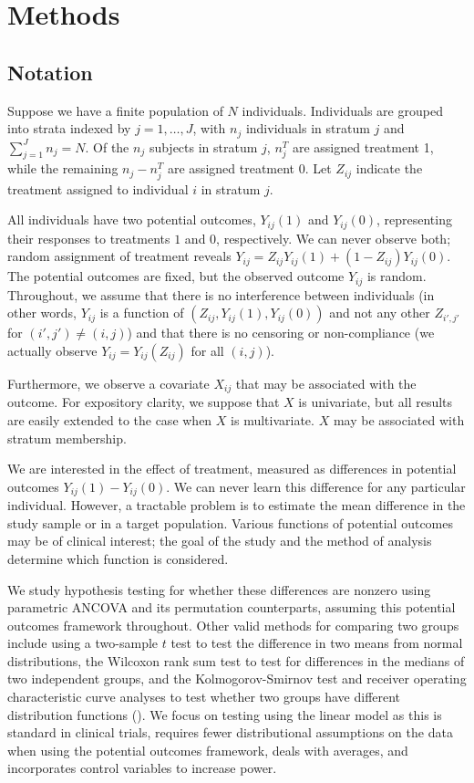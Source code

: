 \documentclass[12pt]{article}
\begin{document}
\section{Methods}\label{sec:methods}

\subsection{Notation}
Suppose we have a finite population of $N$ individuals.
Individuals are grouped into strata indexed by $j = 1, \dots, J$, with $n_j$ individuals in stratum $j$ and $\sum_{j=1}^J n_j = N$.
Of the $n_j$ subjects in stratum $j$, $n_j^T$ are assigned treatment 1, while the remaining $n_j - n_j^T$ are assigned treatment 0.
Let $Z_{ij}$ indicate the treatment assigned to individual $i$ in stratum $j$.

All individuals have two potential outcomes, $Y_{ij}(1)$ and $Y_{ij}(0)$, representing their responses to treatments $1$ and $0$, respectively.
We can never observe both; random assignment of treatment reveals $Y_{ij} = Z_{ij}Y_{ij}(1) + (1-Z_{ij})Y_{ij}(0)$.
The potential outcomes are fixed, but the observed outcome $Y_{ij}$ is random.
Throughout, we assume that there is no interference between individuals 
(in other words, $Y_{ij}$ is a function of $(Z_{ij}, Y_{ij}(1), Y_{ij}(0))$ and not any other $Z_{i', j'}$ for $(i', j') \neq (i, j)$)
and that there is no censoring or non-compliance
(we actually observe $Y_{ij} = Y_{ij}(Z_{ij})$ for all $(i, j)$).

Furthermore, we observe a covariate $X_{ij}$ that may be associated with the outcome.
For expository clarity, we suppose that $X$ is univariate, but all results are easily extended to the case when $X$ is multivariate.
$X$ may be associated with stratum membership.

We are interested in the effect of treatment, measured as differences in potential outcomes $Y_{ij}(1) - Y_{ij}(0)$.
We can never learn this difference for any particular individual.
However, a tractable problem is to estimate the mean difference in the study sample or in a target population.
Various functions of potential outcomes may be of clinical interest; the goal of the study and the method of analysis determine which function is considered.

We study hypothesis testing for whether these differences are nonzero using parametric ANCOVA and its permutation counterparts, assuming this potential outcomes framework throughout.
Other valid methods for comparing two groups include using a two-sample $t$ test to test the difference in two means from normal distributions,
the Wilcoxon rank sum test to test for differences in the medians of two independent groups, 
and the Kolmogorov-Smirnov test and receiver operating characteristic curve analyses to test whether two groups have different distribution functions (\cite{lehmann_nonparametrics_1975,  vexler_statistical_2016}).
We focus on testing using the linear model as this is standard in clinical trials, 
requires fewer distributional assumptions on the data when using the potential outcomes framework, 
deals with averages,
and incorporates control variables to increase power.
\end{document}
